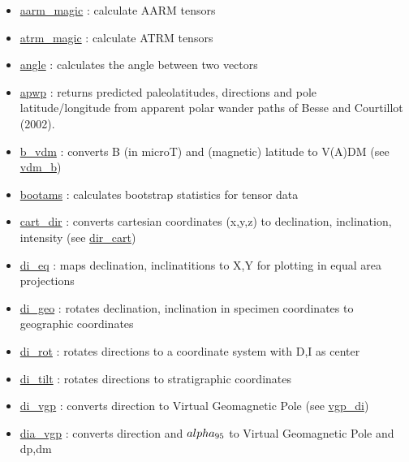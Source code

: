 \documentclass[11pt]{book}
\begin{document}
{{\begin{itemize}
  \item \href{https://pmagpy.github.io/PmagPy_calculations.html#aarm_magic}{aarm\_magic} : calculate AARM tensors
\item \href{https://pmagpy.github.io/PmagPy_calculations.html#atrm_magic}{atrm\_magic} : calculate ATRM tensors
\item \href{https://pmagpy.github.io/PmagPy_calculations.html#angle}{angle} : calculates the angle between two vectors
\item \href{https://pmagpy.github.io/PmagPy_calculations.html#apwp}{apwp} : returns predicted paleolatitudes, directions and pole latitude/longitude from apparent polar wander paths of Besse and Courtillot (2002).
\item \href{https://pmagpy.github.io/PmagPy_calculations.html#b_vdm}{b\_vdm} : converts B (in microT) and (magnetic) latitude to V(A)DM (see \href{https://pmagpy.github.io/PmagPy_calculations.html#vdm_b}{vdm\_b})
\item \href{https://pmagpy.github.io/PmagPy_calculations.html#bootams}{bootams} : calculates bootstrap statistics for tensor data
\item \href{https://pmagpy.github.io/PmagPy_calculations.html#cart_dir}{cart\_dir} : converts cartesian coordinates (x,y,z) to declination, inclination, intensity (see \href{https://pmagpy.github.io/PmagPy_calculations.html#dir_cart}{dir\_cart})
\item \href{https://pmagpy.github.io/PmagPy_calculations.html#di_eq}{di\_eq} : maps declination, inclinatitions to X,Y for plotting in equal area projections
\item \href{https://pmagpy.github.io/PmagPy_calculations.html#di_geo}{di\_geo} : rotates declination, inclination in specimen coordinates to geographic coordinates
\item \href{https://pmagpy.github.io/PmagPy_calculations.html#di_rot}{di\_rot} : rotates directions to a  coordinate system with D,I as center
\item \href{https://pmagpy.github.io/PmagPy_calculations.html#di_tilt}{di\_tilt} : rotates directions to stratigraphic coordinates
\item \href{https://pmagpy.github.io/PmagPy_calculations.html#di_vgp}{di\_vgp} : converts direction to Virtual Geomagnetic Pole (see \href{https://pmagpy.github.io/PmagPy_calculations.html#vgp_di}{vgp\_di})
\item \href{https://pmagpy.github.io/PmagPy_calculations.html#dia_vgp}{dia\_vgp} : converts direction and $\\alpha_{95}$ to Virtual Geomagnetic Pole and dp,dm

\end{itemize}}}
\end{document}
